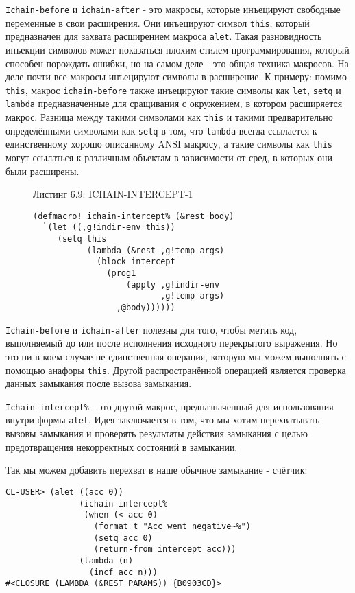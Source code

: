 \verb"Ichain-before" и \verb"ichain-after" - это макросы, которые инъецируют свободные переменные в свои расширения. Они инъецируют символ \verb"this", который предназначен для захвата расширением макроса \verb"alet". Такая разновидность инъекции символов может показаться плохим стилем программирования, который способен порождать ошибки, но на самом деле - это общая техника макросов. На деле почти все макросы инъецируют символы в расширение. К примеру: помимо \verb"this", макрос \verb"ichain-before" также инъецируют такие символы как \verb"let", \verb"setq" и \verb"lambda" предназначенные для сращивания с окружением, в котором расширяется макрос. Разница между такими символами как \verb"this" и такими предварительно определёнными символами как \verb"setq" в том, что \verb"lambda" всегда ссылается к единственному хорошо описанному ANSI макросу, а такие символы как \verb"this" могут ссылаться к различным объектам в зависимости от сред, в которых они были расширены.

\begin{figure}Листинг 6.9: ICHAIN-INTERCEPT-1\label{listing_6.9}
\listbegin
\begin{verbatim}
(defmacro! ichain-intercept% (&rest body)
  `(let ((,g!indir-env this))
     (setq this
           (lambda (&rest ,g!temp-args)
             (block intercept
               (prog1
                   (apply ,g!indir-env
                          ,g!temp-args)
                 ,@body))))))
\end{verbatim}
\listend
\end{figure}

\verb"Ichain-before" и \verb"ichain-after" полезны для того, чтобы метить код, выполняемый до или после исполнения исходного перекрытого выражения. Но это ни в коем случае не единственная операция, которую мы можем выполнять с помощью анафоры \verb"this". Другой распространённой операцией является проверка данных замыкания после вызова замыкания.

\verb"Ichain-intercept%" - это другой макрос, предназначенный для использования внутри формы \verb"alet". Идея заключается в том, что мы хотим перехватывать вызовы замыкания и проверять результаты действия замыкания с целью предотвращения некорректных состояний в замыкании.

Так мы можем добавить перехват в наше обычное замыкание - счётчик:

\begin{verbatim}
CL-USER> (alet ((acc 0))
               (ichain-intercept%
                (when (< acc 0)
                  (format t "Acc went negative~%")
                  (setq acc 0)
                  (return-from intercept acc)))
               (lambda (n)
                 (incf acc n)))
#<CLOSURE (LAMBDA (&REST PARAMS)) {B0903CD}>
\end{verbatim}

